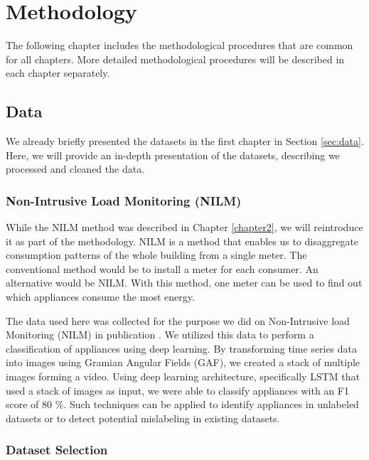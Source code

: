 
\chapter{Methodology} %
\label{chapter3} 

The following chapter includes the methodological procedures that are common for all chapters.
More detailed methodological procedures will be described in each chapter separately. 

\section{Data}
\label{ssec:data}
We already briefly presented the datasets in the first chapter in Section \ref{sec:data}.
Here, we will provide an in-depth presentation of the datasets, describing we processed and cleaned the data. 

\subsection{Non-Intrusive Load Monitoring (NILM)}

While the NILM method was described in Chapter \ref{chapter2}, we will reintroduce it as part of the methodology.
NILM is a method that enables us to disaggregate consumption patterns of the whole building from a single meter.
The conventional method would be to install a meter for each consumer.
An alternative would be NILM. 
With this method, one meter can be used to find out which appliances consume the most energy.

The data used here was collected for the purpose we did on Non-Intrusive load Monitoring (NILM) in publication \cite{Blaz2022}.
We utilized this data to perform a classification of appliances using deep learning.
By transforming time series data into images using Gramian Angular Fields (GAF),
we created a stack of multiple images forming a video.
Using deep learning architecture, specifically LSTM that used a stack of images as input, we were able to classify appliances with an F1 score of 80 \%.
Such techniques can be applied to identify appliances in unlabeled datasets or to detect potential mislabeling in existing datasets.

\subsection{Dataset Selection}

